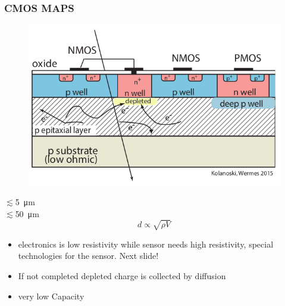     \begin{frame}
        \frametitle{CMOS MAPS}
        \begin{multicols}{2}
            \begin{figure}[h!]
                \centering
                \includegraphics[width=.8\linewidth]{figures/Pixel_detectors/MAPS_scheme.png}
            \end{figure}
            \columnbreak
            $\lesssim$\SI{5}{\um}\\
            $\lesssim$\SI{50}{\um}
            \begin{equation}
                d \propto \sqrt{\rho V}
            \end{equation}
        \end{multicols} 

        \begin{itemize}
            \item electronics is low resistivity while sensor needs high resistivity, special technologies for the sensor. Next slide!
            \item If not completed depleted charge is collected by diffusion
            \item very low Capacity
        \end{itemize}
        \end{frame} 

